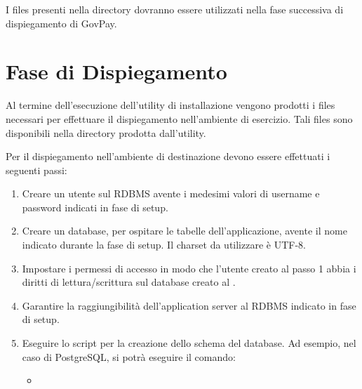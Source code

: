 \documentclass[letterpaper,10pt,italian]{sphinxmanual}
\begin{document}
I files presenti nella directory  dovranno essere utilizzati
nella fase successiva di dispiegamento di GovPay.


\chapter{Fase di Dispiegamento}
\label{\detokenize{dispiegamento/index:fase-di-dispiegamento}}\label{\detokenize{dispiegamento/index:inst-dispiegamento}}\label{\detokenize{dispiegamento/index::doc}}
Al termine dell’esecuzione dell’utility di installazione vengono
prodotti i files necessari per effettuare il dispiegamento nell’ambiente
di esercizio. Tali files sono disponibili nella directory 
prodotta dall’utility.

Per il dispiegamento nell’ambiente di destinazione devono essere
effettuati i seguenti passi:
\begin{enumerate}
\item {} 
Creare un utente sul RDBMS avente i medesimi valori di username e
password indicati in fase di setup.

\item {} 
Creare un database, per ospitare le tabelle dell’applicazione, avente
il nome indicato durante la fase di setup. Il charset da utilizzare è
UTF-8.

\item {} 
Impostare i permessi di accesso in modo che l’utente creato al passo
1 abbia i diritti di lettura/scrittura sul database creato al .

\item {} 
Garantire la raggiungibilità dell’application server al RDBMS
indicato in fase di setup.

\item {} 
Eseguire lo script  per la creazione dello schema
del database. Ad esempio, nel caso di PostgreSQL, si potrà eseguire
il comando:
\begin{itemize}
\item {} 

\end{itemize}

\end{enumerate}
\end{document}
